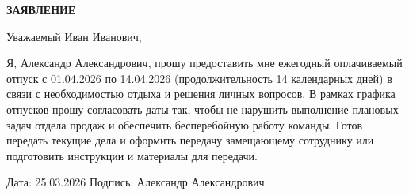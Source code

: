 \documentclass[12pt]{article}
\begin{document}
\begin{center}
\textbf{\LARGE ЗАЯВЛЕНИЕ}
\end{center}

\vspace{1cm}




Уважаемый Иван Иванович,

Я, Александр Александрович, прошу предоставить мне ежегодный оплачиваемый отпуск с 01.04.2026 по 14.04.2026 (продолжительность 14 календарных дней) в связи с необходимостью отдыха и решения личных вопросов. В рамках графика отпусков прошу согласовать даты так, чтобы не нарушить выполнение плановых задач отдела продаж и обеспечить бесперебойную работу команды. Готов передать текущие дела и оформить передачу замещающему сотруднику или подготовить инструкции и материалы для передачи.

\vfill

\noindent
Дата: 25.03.2026 \hfill Подпись: Александр Александрович
\end{document}
